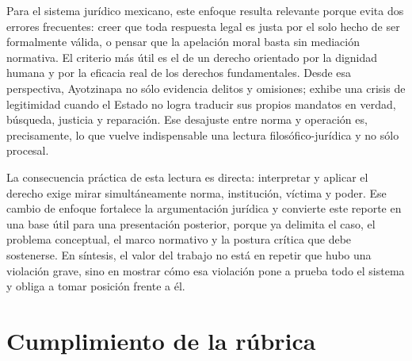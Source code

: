 \documentclass[
	spanish,
	letterpaper, oneside
]{article}
\begin{document}
Para el sistema jurídico mexicano, este enfoque resulta relevante porque evita dos errores frecuentes: creer que toda respuesta legal es justa por el solo hecho de ser formalmente válida, o pensar que la apelación moral basta sin mediación normativa. El criterio más útil es el de un derecho orientado por la dignidad humana y por la eficacia real de los derechos fundamentales. Desde esa perspectiva, Ayotzinapa no sólo evidencia delitos y omisiones; exhibe una crisis de legitimidad cuando el Estado no logra traducir sus propios mandatos en verdad, búsqueda, justicia y reparación. Ese desajuste entre norma y operación es, precisamente, lo que vuelve indispensable una lectura filosófico-jurídica y no sólo procesal.

La consecuencia práctica de esta lectura es directa: interpretar y aplicar el derecho exige mirar simultáneamente norma, institución, víctima y poder. Ese cambio de enfoque fortalece la argumentación jurídica y convierte este reporte en una base útil para una presentación posterior, porque ya delimita el caso, el problema conceptual, el marco normativo y la postura crítica que debe sostenerse. En síntesis, el valor del trabajo no está en repetir que hubo una violación grave, sino en mostrar cómo esa violación pone a prueba todo el sistema y obliga a tomar posición frente a él.

%
\section*{Cumplimiento de la rúbrica}
\end{document}
